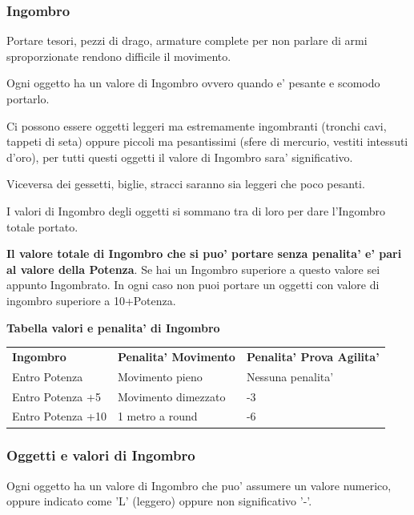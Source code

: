 \documentclass[a4paper,11pt,twoside,openany]{book}
\begin{document}
{		\label{capacituxe0-di-carico-e-trasporto-ingombro}
		
		\subsubsection{Ingombro}
		
		Portare tesori, pezzi di drago, armature complete per non parlare di armi sproporzionate rendono difficile il movimento.
		
		Ogni oggetto ha un valore di Ingombro ovvero quando e' pesante e scomodo portarlo.
		
		
		Ci possono essere oggetti leggeri ma estremamente ingombranti (tronchi cavi, tappeti di seta) oppure piccoli ma pesantissimi (sfere di mercurio, vestiti intessuti d'oro), per tutti questi oggetti il valore di Ingombro sara' significativo.
		
		
		Viceversa dei gessetti, biglie, stracci saranno sia leggeri che poco pesanti.
		
		I valori di Ingombro degli oggetti si sommano tra di loro per dare l'Ingombro totale portato.
		
		\textbf{Il valore totale di Ingombro che si puo' portare senza penalita' e' pari al valore della Potenza}.
		Se hai un Ingombro superiore a questo valore sei appunto Ingombrato. In ogni caso non puoi portare un oggetti con valore di ingombro superiore a 10+Potenza.
		
		\bigskip
		
		\textbf{Tabella valori e penalita' di Ingombro}
		
		\medskip
		
		\begin{tabular}{lll}
			\hline
			\textbf{Ingombro} & \textbf{ Penalita' Movimento}&  \textbf{Penalita' Prova Agilita'}\\
			Entro Potenza&  Movimento pieno& Nessuna penalita' \\
			Entro Potenza +5&  Movimento dimezzato & -3 \\
			Entro Potenza +10&  1 metro a round & -6 \\
		\end{tabular}
		
		\subsubsection{Oggetti e valori di Ingombro}
		
		Ogni oggetto ha un valore di Ingombro che puo' assumere un valore numerico, oppure indicato come 'L' (leggero) oppure non significativo '-'.
		
}
\end{document}
